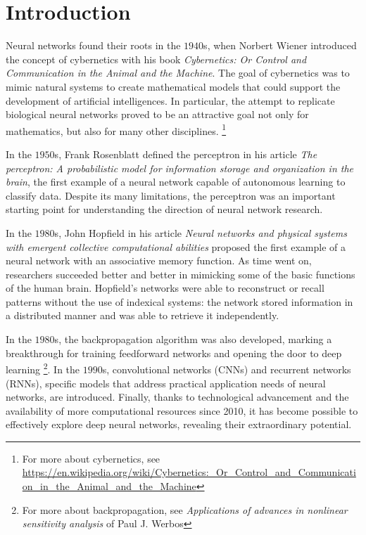 \chapter{Introduction}
\label{ch:introduction}

Neural networks found their roots in the $1940$s, when Norbert Wiener introduced the concept of cybernetics with his book \textit{Cybernetics: Or Control and Communication in the Animal and the Machine}. The goal of cybernetics was to mimic natural systems to create mathematical models that could support the development of artificial intelligences. In particular, the attempt to replicate biological neural networks proved to be an attractive goal not only for mathematics, but also for many other disciplines. \footnote{For more about cybernetics, see \url{https://en.wikipedia.org/wiki/Cybernetics:_Or_Control_and_Communication_in_the_Animal_and_the_Machine}}

\noindent In the $1950$s, Frank Rosenblatt defined the perceptron in his article \textit{The perceptron: A probabilistic model for information storage and organization in the brain}, the first example of a neural network capable of autonomous learning to classify data. Despite its many limitations, the perceptron was an important starting point for understanding the direction of neural network research.

\noindent In the $1980$s, John Hopfield in his article \textit{Neural networks and physical systems with emergent collective computational abilities} proposed the first example of a neural network with an associative memory function. As time went on, researchers succeeded better and better in mimicking some of the basic functions of the human brain. Hopfield's networks were able to reconstruct or recall patterns without the use of indexical systems: the network stored information in a distributed manner and was able to retrieve it independently.

\noindent In the $1980$s, the backpropagation algorithm was also developed, marking a breakthrough for training feedforward networks and opening the door to deep learning \footnote{For more about backpropagation, see \textit{Applications of advances in nonlinear sensitivity analysis} of Paul J. Werbos}. In the $1990$s, convolutional networks (CNNs) and recurrent networks (RNNs), specific models that address practical application needs of neural networks, are introduced. Finally, thanks to technological advancement and the availability of more computational resources since 2010, it has become possible to effectively explore deep neural networks, revealing their extraordinary potential.

